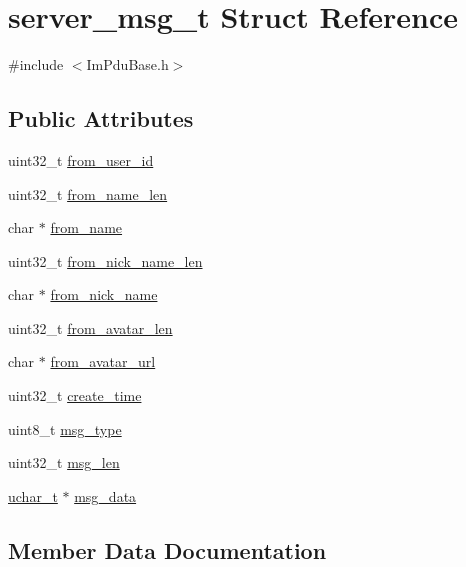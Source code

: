 \hypertarget{structserver__msg__t}{}\section{server\+\_\+msg\+\_\+t Struct Reference}
\label{structserver__msg__t}


{\ttfamily \#include $<$Im\+Pdu\+Base.\+h$>$}

\subsection*{Public Attributes}
\begin{DoxyCompactItemize}
\item 
uint32\+\_\+t \hyperlink{structserver__msg__t_a9f76d43e7c4e2a4162d48cdb3ff54ee8}{from\+\_\+user\+\_\+id}
\item 
uint32\+\_\+t \hyperlink{structserver__msg__t_a82b2648a8922ddbbedbd23879986cbe9}{from\+\_\+name\+\_\+len}
\item 
char $\ast$ \hyperlink{structserver__msg__t_a02ffe731296b4df347242e1b2831908b}{from\+\_\+name}
\item 
uint32\+\_\+t \hyperlink{structserver__msg__t_addb83799819a02de2ac8f44441f58135}{from\+\_\+nick\+\_\+name\+\_\+len}
\item 
char $\ast$ \hyperlink{structserver__msg__t_a8bb3419c67f71d763d28c93ee226f80d}{from\+\_\+nick\+\_\+name}
\item 
uint32\+\_\+t \hyperlink{structserver__msg__t_a33e575f6138a286e136ffd1a015ea92d}{from\+\_\+avatar\+\_\+len}
\item 
char $\ast$ \hyperlink{structserver__msg__t_a83a8f02f81d7ebd1847f81d7108fb9fa}{from\+\_\+avatar\+\_\+url}
\item 
uint32\+\_\+t \hyperlink{structserver__msg__t_a5a4a0e5f687234b7ec6503b1521bec16}{create\+\_\+time}
\item 
uint8\+\_\+t \hyperlink{structserver__msg__t_a29330a0fb497550f5b9beea73dbeaeaa}{msg\+\_\+type}
\item 
uint32\+\_\+t \hyperlink{structserver__msg__t_a429f021c0e86e07ec85defdc8da727eb}{msg\+\_\+len}
\item 
\hyperlink{base_2ostype_8h_a124ea0f8f4a23a0a286b5582137f0b8d}{uchar\+\_\+t} $\ast$ \hyperlink{structserver__msg__t_ab241599330ec030fa8525a281b35c041}{msg\+\_\+data}
\end{DoxyCompactItemize}


\subsection{Member Data Documentation}
\hypertarget{structserver__msg__t_a5a4a0e5f687234b7ec6503b1521bec16}{}
